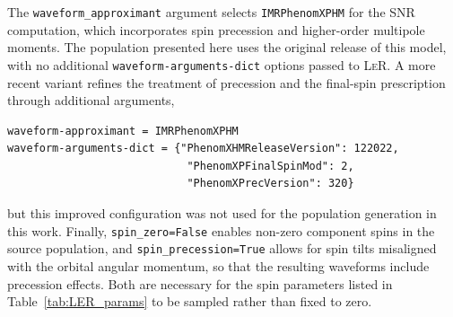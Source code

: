 The \texttt{waveform\_approximant} argument selects 
\texttt{IMRPhenomXPHM} \cite{IMRPhenomXPHM} for the SNR 
computation, which incorporates spin precession and 
higher-order multipole moments. The population presented here uses the original release of this model, with no additional \texttt{waveform-arguments-dict} options passed to \textsc{LeR}. A more recent variant \cite{Colleoni:2024knd} refines the treatment of precession and the final-spin prescription through additional arguments,
\begin{lstlisting}[style=numpyStyle]
waveform-approximant = IMRPhenomXPHM
waveform-arguments-dict = {"PhenomXHMReleaseVersion": 122022,
                            "PhenomXPFinalSpinMod": 2,
                            "PhenomXPrecVersion": 320}
\end{lstlisting}
but this improved configuration was not used for the population generation in this work. Finally, \texttt{spin\_zero=False} enables non-zero component spins in the source population, and \texttt{spin\_\allowbreak precession=\allowbreak True} allows for spin tilts misaligned with the orbital angular momentum, so that the resulting waveforms include precession effects. Both are necessary for the spin parameters listed in Table~\ref{tab:LER_params} to be sampled rather than fixed to zero.


